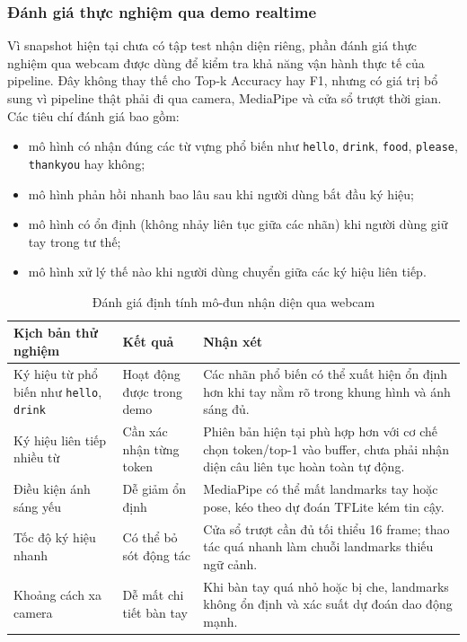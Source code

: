 \subsubsection{Đánh giá thực nghiệm qua demo realtime}

Vì snapshot hiện tại chưa có tập test nhận diện riêng, phần đánh giá thực nghiệm qua webcam được dùng
để kiểm tra khả năng vận hành thực tế của pipeline. Đây không thay thế cho Top-k Accuracy hay F1, nhưng
có giá trị bổ sung vì pipeline thật phải đi qua camera, MediaPipe và cửa sổ trượt thời gian. Các tiêu
chí đánh giá bao gồm:
\begin{itemize}
    \item mô hình có nhận đúng các từ vựng phổ biến như \texttt{hello}, \texttt{drink},
    \texttt{food}, \texttt{please}, \texttt{thankyou} hay không;
    \item mô hình phản hồi nhanh bao lâu sau khi người dùng bắt đầu ký hiệu;
    \item mô hình có ổn định (không nhảy liên tục giữa các nhãn) khi người dùng giữ tay
    trong tư thế;
    \item mô hình xử lý thế nào khi người dùng chuyển giữa các ký hiệu liên tiếp.
\end{itemize}

\begin{table}[H]
\centering
\caption{Đánh giá định tính mô-đun nhận diện qua webcam}
\label{tab:recognition-qualitative}
\begin{tabularx}{\textwidth}{|X|p{3.2cm}|X|}
\hline
\textbf{Kịch bản thử nghiệm} & \textbf{Kết quả} & \textbf{Nhận xét} \\
\hline
Ký hiệu từ phổ biến như \texttt{hello}, \texttt{drink} & Hoạt động được trong demo & Các nhãn phổ biến có thể xuất hiện ổn định hơn khi tay nằm rõ trong khung hình và ánh sáng đủ. \\
\hline
Ký hiệu liên tiếp nhiều từ & Cần xác nhận từng token & Phiên bản hiện tại phù hợp hơn với cơ chế chọn token/top-1 vào buffer, chưa phải nhận diện câu liên tục hoàn toàn tự động. \\
\hline
Điều kiện ánh sáng yếu & Dễ giảm ổn định & MediaPipe có thể mất landmarks tay hoặc pose, kéo theo dự đoán TFLite kém tin cậy. \\
\hline
Tốc độ ký hiệu nhanh & Có thể bỏ sót động tác & Cửa sổ trượt cần đủ tối thiểu 16 frame; thao tác quá nhanh làm chuỗi landmarks thiếu ngữ cảnh. \\
\hline
Khoảng cách xa camera & Dễ mất chi tiết bàn tay & Khi bàn tay quá nhỏ hoặc bị che, landmarks không ổn định và xác suất dự đoán dao động mạnh. \\
\hline
\end{tabularx}
\end{table}

